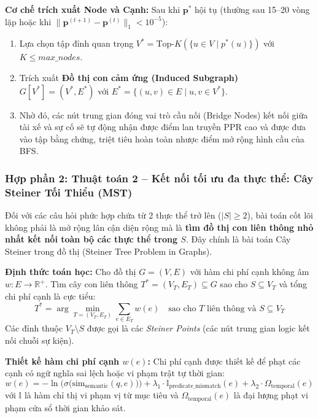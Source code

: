 \documentclass[a4paper,11pt]{article}
\begin{document}
\textbf{Cơ chế trích xuất Node và Cạnh:}
Sau khi $\mathbf{p}^*$ hội tụ (thường sau 15--20 vòng lặp hoặc khi $\|\mathbf{p}^{(t+1)} - \mathbf{p}^{(t)}\|_1 < 10^{-5}$):
\begin{enumerate}[noitemsep]
    \item Lựa chọn tập đỉnh quan trọng $V^* = \text{Top-}K(\{u \in V \mid p^*(u)\})$ với $K \le max\_nodes$.
    \item Trích xuất \textbf{Đồ thị con cảm ứng (Induced Subgraph)} $G[V^*] = (V^*, E^*)$ với $E^* = \{(u, v) \in E \mid u, v \in V^*\}$.
    \item Nhờ đó, các nút trung gian đóng vai trò cầu nối (Bridge Nodes) kết nối giữa tài xế và sự cố sẽ tự động nhận được điểm lan truyền PPR cao và được đưa vào tập bằng chứng, triệt tiêu hoàn toàn nhược điểm mở rộng hình cầu của BFS.
\end{enumerate}

\subsubsection{Hợp phần 2: Thuật toán 2 -- Kết nối tối ưu đa thực thể: Cây Steiner Tối Thiểu (MST)}
\label{sec:algo-steiner}

Đối với các câu hỏi phức hợp chứa từ 2 thực thể trở lên ($|S| \ge 2$), bài toán cốt lõi không phải là mở rộng lân cận diện rộng mà là \textbf{tìm đồ thị con liên thông nhỏ nhất kết nối toàn bộ các thực thể trong $S$}. Đây chính là bài toán Cây Steiner trong đồ thị (Steiner Tree Problem in Graphs).

\textbf{Định thức toán học:} Cho đồ thị $G = (V, E)$ với hàm chi phí cạnh không âm $w: E \to \mathbb{R}^+$. Tìm cây con liên thông $T^* = (V_T, E_T) \subseteq G$ sao cho $S \subseteq V_T$ và tổng chi phí cạnh là cực tiểu:
\begin{equation}
    T^* = \arg\min_{T = (V_T, E_T)} \sum_{e \in E_T} w(e) \quad \text{sao cho } T \text{ liên thông và } S \subseteq V_T
    \label{eq:steiner}
\end{equation}
Các đỉnh thuộc $V_T \setminus S$ được gọi là các \textit{Steiner Points} (các nút trung gian logic kết nối chuỗi sự kiện).

\textbf{Thiết kế hàm chi phí cạnh $w(e)$:}
Chi phí cạnh được thiết kế để phạt các cạnh có ngữ nghĩa sai lệch hoặc vi phạm trật tự thời gian:
\begin{equation}
    w(e) = -\ln \Big( \sigma \big(\text{sim}_{\text{semantic}}(q, e)\big) \Big) + \lambda_1 \cdot \mathbb{I}_{\text{predicate\_mismatch}}(e) + \lambda_2 \cdot \Omega_{\text{temporal}}(e)
\end{equation}
với $\mathbb{I}$ là hàm chỉ thị vi phạm vị từ mục tiêu và $\Omega_{\text{temporal}}(e)$ là đại lượng phạt vi phạm cửa sổ thời gian khảo sát.
\end{document}
